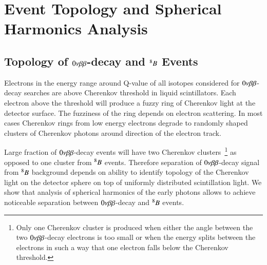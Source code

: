 \section{Event Topology and Spherical Harmonics Analysis}
\label{sec:topology_and_harmonics}

\subsection{Topology of $0\nu\beta\beta$-decay and $^{8}B$ Events}
\label{subsec:topology}

Electrons in the energy range around Q-value of all isotopes considered for $0\nu\beta\beta$-decay searches are above Cherenkov threshold in liquid scintillators. Each electron above the threshold will produce a fuzzy ring of Cherenkov light at the detector surface. The fuzziness of the ring depends on electron scattering. In most cases Cherenkov rings from low energy electrons degrade to randomly shaped clusters of Cherenkov photons around direction of the electron track. 

Large fraction of $0\nu\beta\beta$-decay events will have two Cherenkov clusters~\footnote{Only one Cherenkov cluster is produced when either the angle between the two $0\nu\beta\beta$-decay electrons is too small or when the energy splits between the electrons in such a way that one electron falls below the Cherenkov threshold.} as opposed to one cluster from $^{8}B$ events. Therefore separation of $0\nu\beta\beta$-decay signal from $^{8}B$ background depends on ability to identify topology of the Cherenkov light on the detector sphere on top of uniformly distributed scintillation light. We show that analysis of spherical harmonics of the early photons allows to achieve noticeable separation between $0\nu\beta\beta$-decay and $^{8}B$ events.




